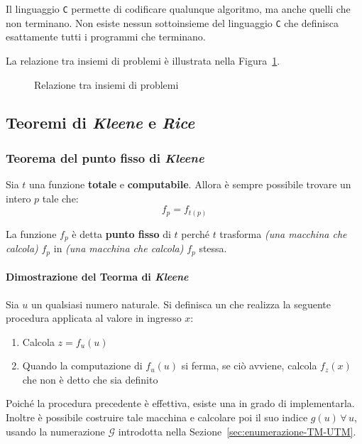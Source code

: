 \documentclass[italian, 10pt]{article}
\begin{document}
Il linguaggio \texttt{C} permette di codificare qualunque algoritmo, ma anche quelli che non terminano.
Non esiste nessun sottoinsieme del linguaggio \texttt{C} che definisca esattamente tutti i programmi che terminano.

\bigskip
La relazione tra insiemi di problemi è illustrata nella Figura~\ref{fig:relazione-tra-insiemi-di-problemi}.

\begin{figure}[htbp]
  \bigskip
  \centering
  \caption{Relazione tra insiemi di problemi}
  \label{fig:relazione-tra-insiemi-di-problemi}
  \bigskip
\end{figure}

\subsection{Teoremi di \textit{Kleene} e \textit{Rice}}

\subsubsection{Teorema del punto fisso di \textit{Kleene}}

Sia \(t\) una funzione \textbf{totale} e \textbf{computabile}.
Allora è sempre possibile trovare un intero \(p\) tale che:
\[ f_p = f_{t(p)} \]

La funzione \(f_p\) è detta \textbf{punto fisso} di \(t\) perché \(t\) trasforma \textit{(una macchina che calcola)} \(f_p\) in \textit{(una macchina che calcola)} \(f_p\) stessa.

\paragraph{Dimostrazione del Teorma di \textit{Kleene}}

Sia \(u\) un qualsiasi numero naturale.
Si definisca un \TM che realizza la seguente procedura applicata al valore in ingresso \(x\):

\begin{enumerate}
  \item Calcola \(z = f_u(u)\)
  \item Quando la computazione di \(f_u(u)\) si ferma, se ciò avviene, calcola \(f_z(x)\) che non è detto che sia definito
\end{enumerate}

Poiché la procedura precedente è effettiva, esiste una \TM in grado di implementarla.
Inoltre è possibile costruire tale macchina e calcolare poi il suo indice \(g(u) \, \forall \, u\), usando la numerazione \(\mathscr{G}\) introdotta nella Sezione~\ref{sec:enumerazione-TM-UTM}.
\end{document}
